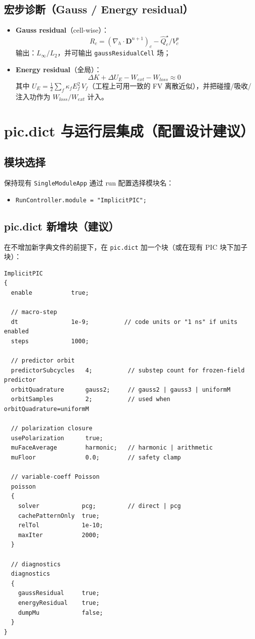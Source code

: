 \documentclass[UTF8,a4paper,12pt]{ctexart}
\newcommand{\code}[1]{\texttt{#1}}
\begin{document}
\subsection{宏步诊断（Gauss / Energy residual）}
\begin{itemize}[leftmargin=2em]
  \item \textbf{Gauss residual}（cell-wise）：
  \[
    R_c = (\nabla_h\cdot\bm{D}^{n+1})_c - \widehat{Q}_c^\star/V_c^p
  \]
  输出：$L_\infty/L_2$，并可输出 \code{gaussResidualCell} 场；
  \item \textbf{Energy residual}（全局）：
  \[
    \Delta K + \Delta U_E - W_{ext} - W_{loss} \approx 0
  \]
  其中 $U_E=\tfrac12\sum_f \kappa_f E_f^2\,V_f$（工程上可用一致的 FV 离散近似），并把碰撞/吸收/注入功作为 $W_{loss}/W_{ext}$ 计入。
\end{itemize}

\section{pic.dict 与运行层集成（配置设计建议）}

\subsection{模块选择}
保持现有 \code{SingleModuleApp} 通过 run 配置选择模块名：
\begin{itemize}[leftmargin=2em]
  \item \code{RunController.module = "ImplicitPIC";}
\end{itemize}

\subsection{pic.dict 新增块（建议）}
在不增加新字典文件的前提下，在 \code{pic.dict} 加一个块（或在现有 PIC 块下加子块）：
\begin{lstlisting}[language={},basicstyle=\ttfamily\small]
ImplicitPIC
{
  enable           true;

  // macro-step
  dt               1e-9;          // code units or "1 ns" if units enabled
  steps            1000;

  // predictor orbit
  predictorSubcycles   4;          // substep count for frozen-field predictor
  orbitQuadrature      gauss2;     // gauss2 | gauss3 | uniformM
  orbitSamples         2;          // used when orbitQuadrature=uniformM

  // polarization closure
  usePolarization      true;
  muFaceAverage        harmonic;   // harmonic | arithmetic
  muFloor              0.0;        // safety clamp

  // variable-coeff Poisson
  poisson
  {
    solver            pcg;         // direct | pcg
    cachePatternOnly  true;
    relTol            1e-10;
    maxIter           2000;
  }

  // diagnostics
  diagnostics
  {
    gaussResidual     true;
    energyResidual    true;
    dumpMu            false;
  }
}
\end{lstlisting}
\end{document}

